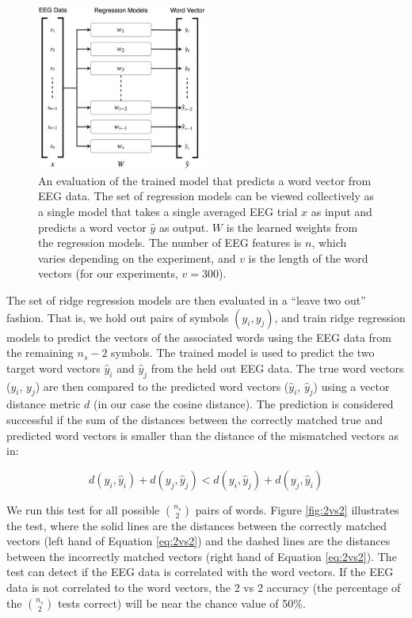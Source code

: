   \begin{figure}[t]
    \centering
    \includegraphics[width=0.5\textwidth]{figures/features}
    \caption{An evaluation of the trained model that predicts a word vector from EEG data. The set of regression models can be viewed collectively as a single model that takes a single averaged EEG trial $x$ as input and predicts a word vector $\hat{y}$ as output. $W$ is the learned weights from the regression models. The number of EEG features is $n$, which varies depending on the experiment, and $v$ is the length of the word vectors (for our experiments, $v=300$).}
    \label{fig:features}
  \end{figure}

  The set of ridge regression models are then evaluated in a ``leave two out'' fashion. That is, we hold out pairs of symbols $(y_i, y_j)$, and train ridge regression models to predict the vectors of the associated words using the EEG data from the remaining $n_s-2$ symbols.  The trained model is used to predict the two target word vectors $\hat{y}_i$ and $\hat{y}_j$ from the held out EEG data. The true word vectors ($y_i$, $y_j$) are then compared to the predicted word vectors ($\hat{y}_i$, $\hat{y}_j$) using a vector distance metric $d$ (in our case the cosine distance). The prediction is considered successful if the sum of the distances between the correctly matched true and predicted word vectors is smaller than the distance of the mismatched vectors as in: 
  
  \begin{equation}
    d(y_i, \hat{y}_i) + d(y_j, \hat{y}_j) < d(y_i, \hat{y}_j) + d(y_j, \hat{y}_i)
    \label{eq:2vs2}
  \end{equation}
  
  \noindent We run this test for all possible ${\binom{n_s}{2}}$ pairs of words. Figure \ref{fig:2vs2} illustrates the \tvt test, where the solid lines are the distances between the correctly matched vectors (left hand of Equation \ref{eq:2vs2}) and the dashed lines are the distances between the incorrectly matched vectors (right hand of Equation \ref{eq:2vs2}). The \tvt test can detect if the EEG data is correlated with the word vectors. If the EEG data is not correlated to the word vectors, the 2 vs 2 accuracy (the percentage of the ${\binom{n_s}{2}}$ \tvt tests correct) will be  near the chance value of 50\%.

